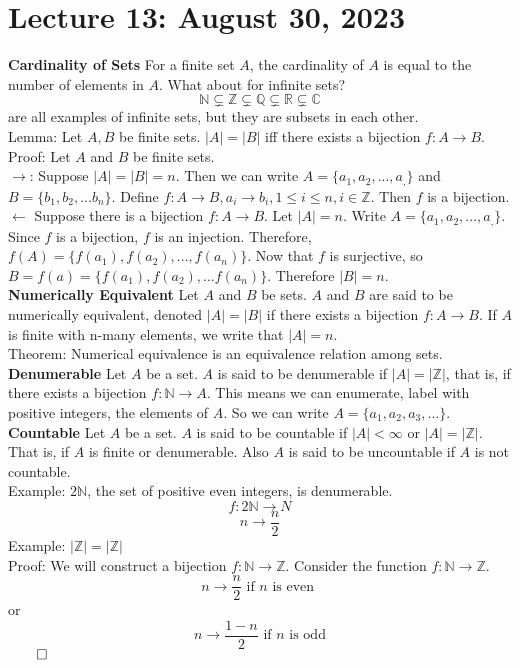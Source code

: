 \documentclass{article}
\begin{document}
\section{Lecture 13: August 30, 2023}
\textbf{Cardinality of Sets} For a finite set \(A\), the cardinality of \(A\) is equal to the number of elements in \(A\). What about for infinite sets?
\[\mathbb{N} \subsetneq \mathbb{Z} \subsetneq \mathbb{Q} \subsetneq \mathbb{R} \subsetneq \mathbb{C}\]
are all examples of infinite sets, but they are subsets in each other.\\
Lemma: Let \(A,B\) be finite sets. \(|A| = |B|\) iff there exists a bijection \(f: A \to B\).\\
Proof: Let \(A\) and \(B\) be finite sets.\\
\(\rightarrow\): Suppose \(|A| = |B| = n\). Then we can write \(A = \{a_1,a_2,...,a_,\}\) and \(B = \{b_1,b_2,...b_n\}\). Define \(f: A \to B, a_i \to b_i, 1 \leq i \leq n, i \in \mathbb{Z}\). Then \(f\) is a bijection.\\
\(\leftarrow\) Suppose there is a bijection \(f: A \to B\). Let \(|A| = n\). Write \(A = \{a_1,a_2,...,a_,\}\). Since \(f\) is a bijection, \(f\) is an injection. Therefore, \(f(A)= \{f(a_1),f(a_2),...,f(a_n)\}\). Now that \(f\) is surjective, so \(B = f(a) = \{f(a_1),f(a_2),...f(a_n)\}\). Therefore \(|B| = n\).\\
\textbf{Numerically Equivalent} Let \(A\) and \(B\) be sets. \(A\) and \(B\) are said to be numerically equivalent, denoted \(|A| = |B|\) if there exists a bijection \(f: A \to B\). If \(A\) is finite with n-many elements, we write that \(|A| = n\).\\
Theorem: Numerical equivalence is an equivalence relation among sets.\\
\textbf{Denumerable} Let \(A\) be a set. \(A\) is said to be denumerable if \(|A| = |\mathbb{Z}|\), that is, if there exists a bijection \(f: \mathbb{N} \to A\). This means we can enumerate, label with positive integers, the elements of \(A\). So we can write \(A = \{a_1,a_2,a_3,...\}\).\\
\textbf{Countable} Let \(A\) be a set. \(A\) is said to be countable if \(|A| < \infty\) or \(|A| = |\mathbb{Z}|\). That is, if \(A\) is finite or denumerable. Also \(A\) is said to be uncountable if \(A\) is not countable.\\
Example: \(2\mathbb{N}\), the set of positive even integers, is denumerable.
\[f:2\mathbb{N} \to N\]
\[n \to \frac{n}{2}\]
Example: \(|\mathbb{Z}| = |\mathbb{Z}|\)\\
Proof: We will construct a bijection \(f: \mathbb{N} \to \mathbb{Z}\). Consider the function \(f: \mathbb{N} \to \mathbb{Z}\).
\[n \to \frac{n}{2} \text{ if } n \text{ is even }\]
or
\[n \to \frac{1-n}{2} \text{ if } n \text{ is odd}\]
\(\qed\)
\end{document}
